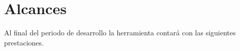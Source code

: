 \documentclass[11pt,letterpaper]{article}
\begin{document}
\section{Alcances}
Al final del periodo de desarrollo la herramienta contará con las siguientes prestaciones.
\end{document}

